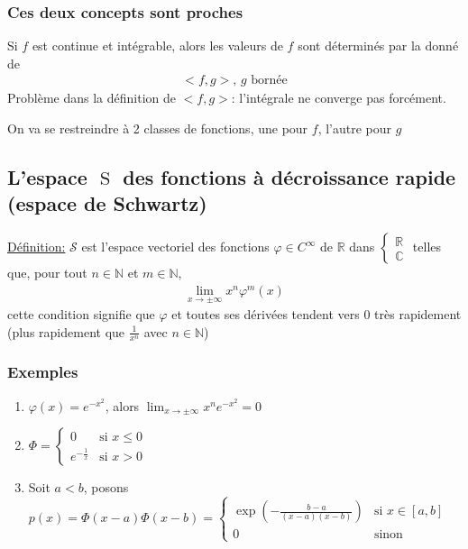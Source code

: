 \subsubsection{Ces deux concepts sont proches}
Si $f$ est continue et intégrable, alors les valeurs de $f$ sont déterminés par la donné de
\begin{eqnarray*}
	<f,g>, \,g\text{ bornée}
\end{eqnarray*}
Problème dans la définition de $<f,g>$: l'intégrale ne converge pas forcément.

On va se restreindre à 2 classes de fonctions, une pour $f$, l'autre pour $g$
\subsection{L'espace $\mathop S$ des fonctions à décroissance rapide (espace de Schwartz)}
\underline{Définition:} $\mathcal S$ est l'espace vectoriel des fonctions $\varphi\in C^{\infty}$ de $\mathbb R$ dans $\begin{cases}
	\mathbb R\\
	\mathbb C
\end{cases}$ telles que, pour tout $n\in\mathbb N$ et $m\in\mathbb N$,
\begin{eqnarray}
	\lim_{x\rightarrow \pm\infty} x^n\varphi^{m}(x)
\end{eqnarray}
cette condition signifie que $\varphi$ et toutes ses dérivées tendent vers $0$ très rapidement (plus rapidement que $\frac{1}{x^n}$ avec $n\in\mathbb N$)
\subsubsection{Exemples}
\begin{enumerate}
	\item $\varphi(x)=e^{-x^2}$, alors $\lim_{x\rightarrow \pm\infty}x^ne^{-x^2}=0$
	
	
	\item $\Phi=
	\begin{cases}
		0&\text{si }x\leq0
		\\
		e^{-\frac{1}{x}}&\text{si }x>0
	\end{cases}$
	
	\item Soit $a<b$, posons $p(x)=\Phi(x-a)\Phi(x-b)=
	\begin{cases}
		\exp{(-\frac{b-a}{(x-a)(x-b)})}&\text{si }x\in[a,b]
		\\
		0&\text{sinon }%
	\end{cases}$
\end{enumerate}

